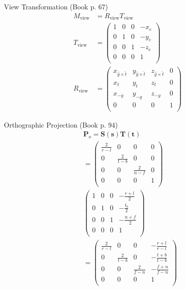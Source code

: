 \documentclass[10pt,a4paper]{article}
\begin{document}
\begin{multicols}{3}
		View Transformation (Book p. 67)
		\begin{align*}
			M_\text{view} &= R_\text{view}T_\text{view}\\
			T_\text{view} &= \begin{pmatrix}
				1 & 0 & 0 & -x_e \\
				0 & 1 & 0 & -y_e \\
				0 & 0 & 1 & -z_e \\
				0 & 0 & 0 & 1 \\
			\end{pmatrix}\\
			R_\text{view} &= \begin{pmatrix}
				x_{\hat{g}\times\hat{t}} & y_{\hat{g}\times\hat{t}} & z_{\hat{g}\times\hat{t}} & 0 \\
				x_t & y_t & z_t & 0 \\
				x_{-g} & y_{-g} & z_{-g} & 0 \\
				0 & 0 & 0 & 1 \\
			\end{pmatrix}
		\end{align*}

		Orthographic Projection (Book p. 94)
		\begin{align*}
			&\mathbf{P}_o = \mathbf{S}(\mathbf{s})\mathbf{T}(\mathbf{t}) \\
				&= \begin{pmatrix}
					\frac{2}{r-l} & 0 & 0 & 0 \\
					0 & \frac{2}{t-b} & 0 & 0 \\
					0 & 0 & \frac{2}{n-f} & 0 \\
					0 & 0 & 0 & 1 \\
				\end{pmatrix}\\&\begin{pmatrix}
					1 & 0 & 0 & -\frac{r+l}{2} \\
					0 & 1 & 0 & -\frac{t_b}{2} \\
					0 & 0 & 1 & -\frac{n+f}{2} \\
					0 & 0 & 0 & 1 \\
				\end{pmatrix} \\
				&= \begin{pmatrix}
					\frac{2}{r-l} & 0 & 0 & -\frac{r+l}{r-l} \\
					0 & \frac{2}{t-b} & 0 & -\frac{t+b}{t-b} \\
					0 & 0 & \frac{2}{f-n} & -\frac{f+n}{f-n} \\
					0 & 0 & 0 & 1 \\
				\end{pmatrix}
		\end{align*}


\end{multicols}
\end{document}
